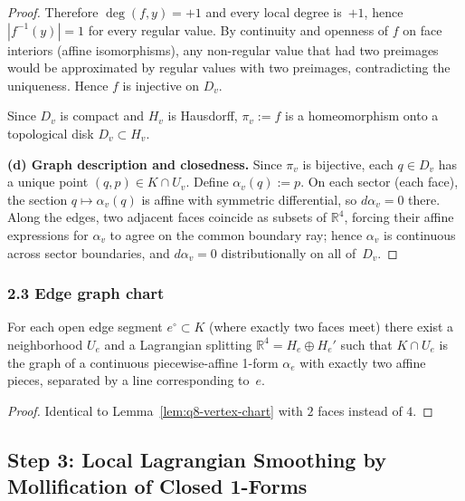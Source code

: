 \begin{proof}
Therefore $\deg(f,y)=+1$ and every local degree is~$+1$, hence
$|f^{-1}(y)|=1$ for every regular value.  By continuity and openness of $f$
on face interiors (affine isomorphisms), any non-regular value
that had two preimages would be approximated by regular values with two preimages,
contradicting the uniqueness.  Hence $f$ is injective on $D_v$.

Since $D_v$ is compact and $H_v$ is Hausdorff, $\pi_v:=f$ is a homeomorphism onto
a topological disk $D_v\subset H_v$.

\textbf{(d) Graph description and closedness.}
Since $\pi_v$ is bijective, each $q\in D_v$ has a unique point $(q,p)\in K\cap U_v$.
Define $\alpha_v(q):=p$.  On each sector (each face), the section $q\mapsto\alpha_v(q)$
is affine with symmetric differential, so $d\alpha_v=0$ there.  Along the edges,
two adjacent faces coincide as subsets of $\mathbb R^4$, forcing their affine expressions for
$\alpha_v$ to agree on the common boundary ray; hence $\alpha_v$ is continuous across
sector boundaries, and $d\alpha_v=0$ distributionally on all of~$D_v$.
\end{proof}


\subsubsection*{2.3 Edge graph chart}

\begin{lemma}\label{lem:q8-edge-chart}
For each open edge segment $e^\circ\subset K$ (where exactly two faces meet)
there exist a neighborhood $U_e$ and a Lagrangian splitting
$\mathbb R^4=H_e\oplus H_e'$ such that $K\cap U_e$ is the graph of a continuous
piecewise-affine 1-form $\alpha_e$ with exactly two affine pieces,
separated by a line corresponding to~$e$.
\end{lemma}

\begin{proof}
Identical to Lemma~\ref{lem:q8-vertex-chart} with $2$ faces instead of $4$.
\end{proof}


\subsection*{Step 3: Local Lagrangian Smoothing by Mollification of Closed 1-Forms}

